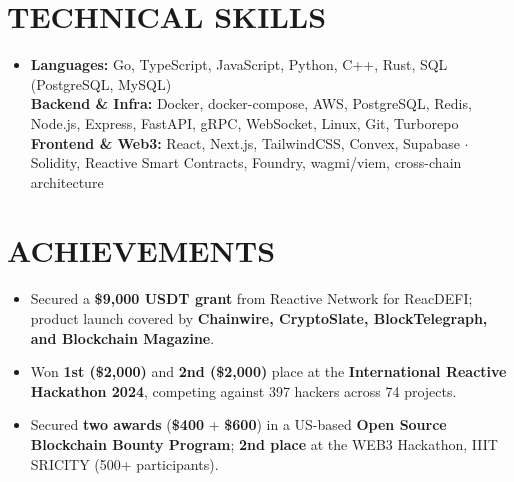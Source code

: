 \documentclass[letterpaper,10pt]{article}
\newcommand{\resumeItem}[1]{
  \item\small{
    {#1 \vspace{-2pt}}
  }
}
\newcommand{\resumeItemListStart}{\begin{itemize}}
\newcommand{\resumeItemListEnd}{\end{itemize}\vspace{-4pt}}
\begin{document}
\section{TECHNICAL SKILLS}
 \begin{itemize}[leftmargin=0.15in, label={}]
    \item{
     \textbf{Languages:}{ Go, TypeScript, JavaScript, Python, C++, Rust, SQL (PostgreSQL, MySQL)} \\
     \textbf{Backend \& Infra:}{ Docker, docker-compose, AWS, PostgreSQL, Redis, Node.js, Express, FastAPI, gRPC, WebSocket, Linux, Git, Turborepo} \\
     \textbf{Frontend \& Web3:}{ React, Next.js, TailwindCSS, Convex, Supabase $\cdot$ Solidity, Reactive Smart Contracts, Foundry, wagmi/viem, cross-chain architecture} \\
    }
 \end{itemize}

\section{ACHIEVEMENTS}
  \resumeItemListStart
      \resumeItem{Secured a \textbf{\$9,000 USDT grant} from Reactive Network for ReacDEFI; product launch covered by \textbf{Chainwire, CryptoSlate, BlockTelegraph, and Blockchain Magazine}.}
      \resumeItem{Won \textbf{1st (\$2,000)} and \textbf{2nd (\$2,000)} place at the \textbf{International Reactive Hackathon 2024}, competing against 397 hackers across 74 projects.}
      \resumeItem{Secured \textbf{two awards} (\textbf{\$400} + \textbf{\$600}) in a US-based \textbf{Open Source Blockchain Bounty Program}; \textbf{2nd place} at the WEB3 Hackathon, IIIT SRICITY (500+ participants).}
  \resumeItemListEnd
\end{document}
